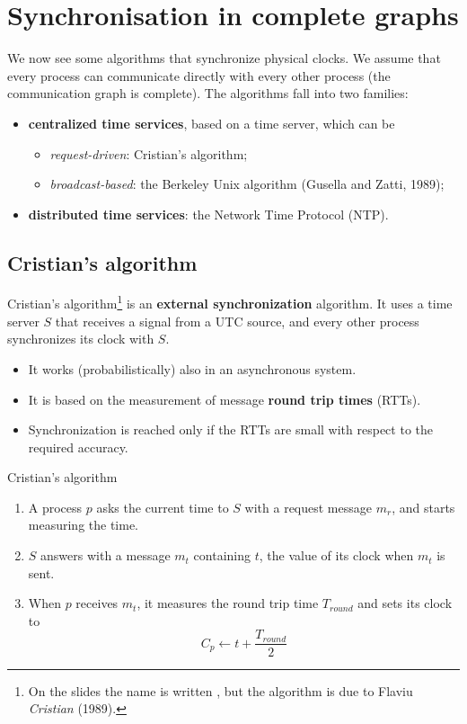 
\section{Synchronisation in complete graphs}

We now see some algorithms that synchronize physical clocks. We assume that every process can communicate directly with every other process (the communication graph is complete). The algorithms fall into two families:
\begin{itemize}
  \item \textbf{centralized time services}, based on a time server, which can be
  \begin{itemize}
    \item \textit{request-driven}: Cristian's algorithm;
    \item \textit{broadcast-based}: the Berkeley Unix algorithm (Gusella and Zatti, 1989);
  \end{itemize}
  \item \textbf{distributed time services}: the Network Time Protocol (NTP).
\end{itemize}

\subsection{Cristian's algorithm}

Cristian's algorithm\footnote{On the slides the name is written , but the algorithm is due to Flaviu \textit{Cristian} (1989).} is an \textbf{external synchronization} algorithm. It uses a time server $S$ that receives a signal from a UTC source, and every other process synchronizes its clock with $S$.
\begin{itemize}
  \item It works (probabilistically) also in an asynchronous system.
  \item It is based on the measurement of message \textbf{round trip times} (RTTs).
  \item Synchronization is reached only if the RTTs are small with respect to the required accuracy.
\end{itemize}

\begin{framedalgo}[label={alg:cristian}, unbreakable]{Cristian's algorithm}
  \begin{enumerate}
    \item A process $p$ asks the current time to $S$ with a request message $m_r$, and starts measuring the time.
    \item $S$ answers with a message $m_t$ containing $t$, the value of its clock when $m_t$ is sent.
    \item When $p$ receives $m_t$, it measures the round trip time $T_{round}$ and sets its clock to
    \[C_p \gets t + \frac{T_{round}}{2}\]
  \end{enumerate}
\end{framedalgo}


